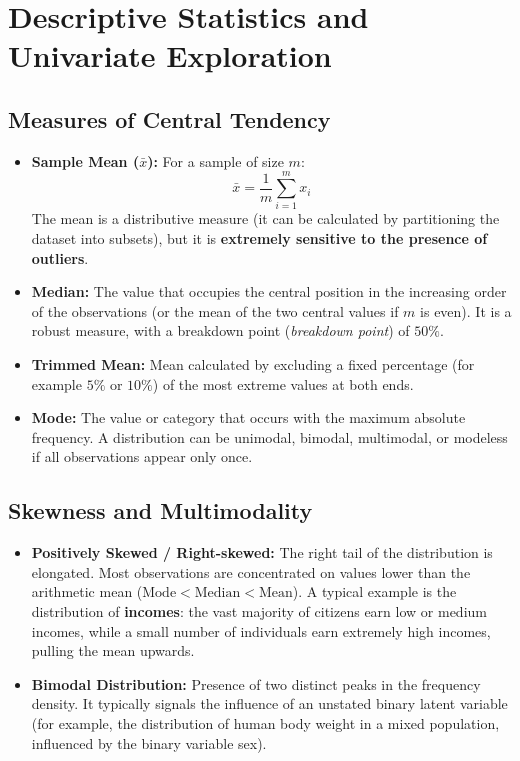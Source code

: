 \section{Descriptive Statistics and Univariate Exploration}

\subsection{Measures of Central Tendency}
\begin{itemize}
    \item \textbf{Sample Mean ($\bar{x}$):} For a sample of size $m$:
    \begin{equation}
    \bar{x} = \frac{1}{m} \sum_{i=1}^m x_i
    \end{equation}
    The mean is a distributive measure (it can be calculated by partitioning the dataset into subsets), but it is \textbf{extremely sensitive to the presence of outliers}.
    \item \textbf{Median:} The value that occupies the central position in the increasing order of the observations (or the mean of the two central values if $m$ is even). It is a robust measure, with a breakdown point (\textit{breakdown point}) of $50\%$.
    \item \textbf{Trimmed Mean:} Mean calculated by excluding a fixed percentage (for example $5\%$ or $10\%$) of the most extreme values at both ends.
    \item \textbf{Mode:} The value or category that occurs with the maximum absolute frequency. A distribution can be unimodal, bimodal, multimodal, or modeless if all observations appear only once.
\end{itemize}

\subsection{Skewness and Multimodality}
\begin{itemize}
    \item \textbf{Positively Skewed / Right-skewed:} The right tail of the distribution is elongated. Most observations are concentrated on values lower than the arithmetic mean ($\text{Mode} < \text{Median} < \text{Mean}$). A typical example is the distribution of \textbf{incomes}: the vast majority of citizens earn low or medium incomes, while a small number of individuals earn extremely high incomes, pulling the mean upwards.
    \item \textbf{Bimodal Distribution:} Presence of two distinct peaks in the frequency density. It typically signals the influence of an unstated binary latent variable (for example, the distribution of human body weight in a mixed population, influenced by the binary variable sex).
\end{itemize}

